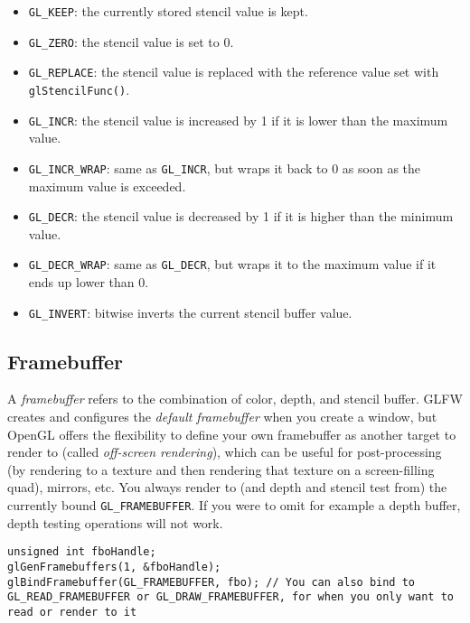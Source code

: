 \documentclass[8pt, table, xcdraw]{article}%
\begin{document}
\begin{itemize}
    \item \lstinline{GL_KEEP}: the currently stored stencil value is kept.
    \item \lstinline{GL_ZERO}: the stencil value is set to 0.
    \item \lstinline{GL_REPLACE}: the stencil value is replaced with the reference value set with \lstinline{glStencilFunc()}.
    \item \lstinline{GL_INCR}: the stencil value is increased by 1 if it is lower than the maximum value.
    \item \lstinline{GL_INCR_WRAP}: same as \lstinline{GL_INCR}, but wraps it back to 0 as soon as the maximum value is exceeded.
    \item \lstinline{GL_DECR}: the stencil value is decreased by 1 if it is higher than the minimum value.
    \item \lstinline{GL_DECR_WRAP}: same as \lstinline{GL_DECR}, but wraps it to the maximum value if it ends up lower than 0.
    \item \lstinline{GL_INVERT}: bitwise inverts the current stencil buffer value.
\end{itemize}

\subsection{Framebuffer} \label{framebuffer}

A \emph{framebuffer} refers to the combination of color, depth, and stencil buffer. GLFW creates and configures the \emph{default framebuffer} when you create a window, but OpenGL offers the flexibility to define your own framebuffer as another target to render to (called \emph{off-screen rendering}), which can be useful for post-processing (by rendering to a texture and then rendering that texture on a screen-filling quad), mirrors, etc. You always render to (and depth and stencil test from) the currently bound \lstinline{GL_FRAMEBUFFER}. If you were to omit for example a depth buffer, depth testing operations will not work.

\begin{lstlisting}
unsigned int fboHandle;
glGenFramebuffers(1, &fboHandle);
glBindFramebuffer(GL_FRAMEBUFFER, fbo); // You can also bind to GL_READ_FRAMEBUFFER or GL_DRAW_FRAMEBUFFER, for when you only want to read or render to it
\end{lstlisting}
\end{document}
